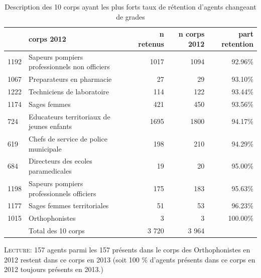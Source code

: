 \documentclass[11pt,a4paper]{article}
\begin{document}
\begin{table}[h!]
	\label{means}
	\centering
	\caption{Description des 10 corps ayant les plus forts taux de rétention d'agents changeant de grades} 
\begin{tabular}{llrrr}
	\toprule
	{} &                                     corps 2012 &  n retenus &  n corps 2012 &  part retention \\
	\midrule
	1192 &  Sapeurs pompiers professionnels non officiers &             1017 &                                         1094 &                                             92.96\% \\
	1067 &                      Preparateurs en pharmacie &               27 &                                           29 &                                             93.10\% \\
	1222 &                     Techniciens de laboratoire &              114 &                                          122 &                                             93.44\% \\
	1174 &                                   Sages femmes &              421 &                                          450 &                                             93.56\% \\
	724  &      Educateurs territoriaux de jeunes enfants &             1695 &                                         1800 &                                             94.17\% \\
	619  &          Chefs de service de police municipale &              198 &                                          210 &                                             94.29\% \\
	684  &            Directeurs des ecoles paramedicales &               19 &                                           20 &                                             95.00\% \\
	1198 &      Sapeurs pompiers professionnels officiers &              175 &                                          183 &                                             95.63\% \\
	1177 &                     Sages femmes territoriales &               51 &                                           53 &                                             96.23\% \\
	1015 &                                 Orthophonistes &                3 &                                            3 &                                            100.00\% \\
	& Total des 10 corps & 3 720 & 3 964 \\
	\bottomrule
\end{tabular}
\begin{minipage}{15cm}
\footnotesize
\textsc{Lecture:} 157 agents parmi les 157 présents dans le corps des Orthophonistes en 2012 restent dans ce corps en 2013 (soit 100 \% d'agents présents dans ce corps en 2012 toujours présents en 2013.)
\end{minipage}
\end{table}
\end{document}
